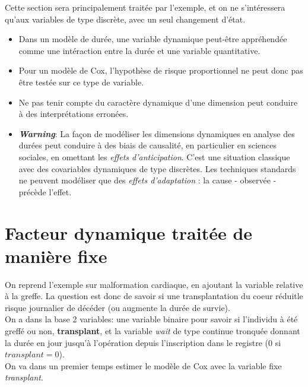 \documentclass[
  12pt,
  letterpaper,
  DIV=11,
  numbers=noendperiod,
  onepage,
  openany]{scrreprt}
\providecommand{\tightlist}{%
  \setlength{\itemsep}{0pt}\setlength{\parskip}{0pt}}\usepackage{longtable,booktabs,array}
\begin{document}
Cette section sera principalement traitée par l'exemple, et on ne
s'intéressera qu'aux variables de type discrète, avec un seul changement
d'état.

\begin{itemize}
\tightlist
\item
  Dans un modèle de durée, une variable dynamique peut-être appréhendée
  comme une intéraction entre la durée et une variable quantitative.
\item
  Pour un modèle de Cox, l'hypothèse de risque proportionnel ne peut
  donc pas être testée sur ce type de variable.
\item
  Ne pas tenir compte du caractère dynamique d'une dimension peut
  conduire à des interprétations erronées.
\item
  \textbf{\emph{Warning}}: La façon de modéliser les dimensions
  dynamiques en analyse des durées peut conduire à des biais de
  causalité, en particulier en sciences sociales, en omettant les
  \emph{effets d'anticipation}. C'est une situation classique avec des
  covariables dynamiques de type discrètes. Les techniques standards ne
  peuvent modéliser que des \emph{effets d'adaptation} : la cause -
  observée - précède l'effet.
\end{itemize}

\hypertarget{facteur-dynamique-traituxe9e-de-maniuxe8re-fixe}{%
\section{Facteur dynamique traitée de manière
fixe}\label{facteur-dynamique-traituxe9e-de-maniuxe8re-fixe}}

On reprend l'exemple sur malformation cardiaque, en ajoutant la variable
relative à la greffe. La question est donc de savoir si une
transplantation du coeur réduitle risque journalier de décéder (ou
augmente la durée de survie).\\
On a dans la base 2 variables: une variable binaire pour savoir si
l'individu à été greffé ou non, \textbf{transplant}, et la variable
\emph{wait} de type continue tronquée donnant la durée en jour jusqu'à
l'opération depuis l'inscription dans le registre (0 si
\(transplant=0\)).\\
On va dans un premier temps estimer le modèle de Cox avec la variable
fixe \emph{transplant}.
\end{document}
